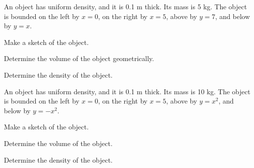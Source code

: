 \begin{problem}
\item An object has uniform density, and it is 0.1 m thick. Its mass
  is 5 kg. The object is bounded on the left by $x=0$, on the right by
  $x=5$, above by $y=7$, and below by $y=x$.
  \begin{subproblem}
    \item Make a sketch of the object.
      \vfill
    \item Determine the volume of the object geometrically.
      \vfill
    \item Determine the density of the object.
      \vfill
  \end{subproblem}
  \clearpage

\item An object has uniform density, and it is 0.1 m thick. Its mass
  is 10 kg. The object is bounded on the left by $x=0$, on the right
  by $x=5$, above by $y=x^2$, and below by $y=-x^2$.
  \begin{subproblem}
    \item Make a sketch of the object.
      \vfill
    \item Determine the volume of the object.
      \vfill
    \item Determine the density of the object.
      \vfill
  \end{subproblem}

\end{problem}

